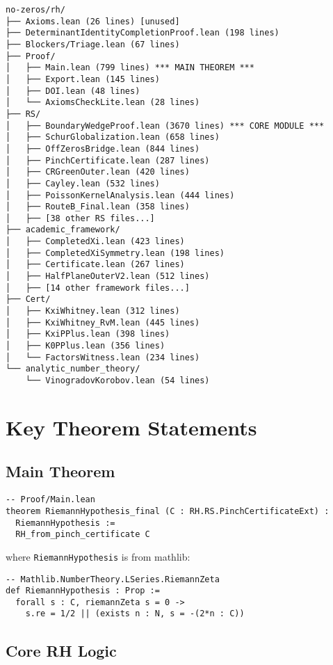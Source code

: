 \documentclass[12pt,a4paper]{article}
\begin{document}
\begin{small}
\begin{verbatim}
no-zeros/rh/
├── Axioms.lean (26 lines) [unused]
├── DeterminantIdentityCompletionProof.lean (198 lines)
├── Blockers/Triage.lean (67 lines)
├── Proof/
│   ├── Main.lean (799 lines) *** MAIN THEOREM ***
│   ├── Export.lean (145 lines)
│   ├── DOI.lean (48 lines)
│   └── AxiomsCheckLite.lean (28 lines)
├── RS/
│   ├── BoundaryWedgeProof.lean (3670 lines) *** CORE MODULE ***
│   ├── SchurGlobalization.lean (658 lines)
│   ├── OffZerosBridge.lean (844 lines)
│   ├── PinchCertificate.lean (287 lines)
│   ├── CRGreenOuter.lean (420 lines)
│   ├── Cayley.lean (532 lines)
│   ├── PoissonKernelAnalysis.lean (444 lines)
│   ├── RouteB_Final.lean (358 lines)
│   ├── [38 other RS files...]
├── academic_framework/
│   ├── CompletedXi.lean (423 lines)
│   ├── CompletedXiSymmetry.lean (198 lines)
│   ├── Certificate.lean (267 lines)
│   ├── HalfPlaneOuterV2.lean (512 lines)
│   ├── [14 other framework files...]
├── Cert/
│   ├── KxiWhitney.lean (312 lines)
│   ├── KxiWhitney_RvM.lean (445 lines)
│   ├── KxiPPlus.lean (398 lines)
│   ├── K0PPlus.lean (356 lines)
│   └── FactorsWitness.lean (234 lines)
└── analytic_number_theory/
    └── VinogradovKorobov.lean (54 lines)
\end{verbatim}
\end{small}

\section{Key Theorem Statements}

\subsection{Main Theorem}

\begin{lstlisting}[language=Lean]
-- Proof/Main.lean
theorem RiemannHypothesis_final (C : RH.RS.PinchCertificateExt) :
  RiemannHypothesis :=
  RH_from_pinch_certificate C
\end{lstlisting}

where \texttt{RiemannHypothesis} is from mathlib:
\begin{lstlisting}[language=Lean]
-- Mathlib.NumberTheory.LSeries.RiemannZeta
def RiemannHypothesis : Prop :=
  forall s : C, riemannZeta s = 0 ->
    s.re = 1/2 || (exists n : N, s = -(2*n : C))
\end{lstlisting}

\subsection{Core RH Logic}
\end{document}
